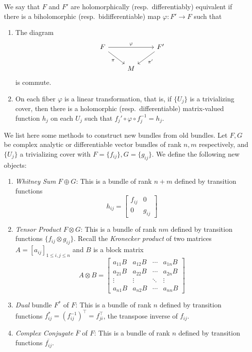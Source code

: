 \begin{defn}
    We say that $F$ and $F'$ are holomorphically (resp.\ differentiably) equivalent if there is a biholomorphic (resp.\ bidifferentiable) map $\varphi:F'\to F$ such that
    \begin{enumerate}[(1)]
        \item The diagram
        \[\begin{tikzcd}
            F\ar[rr,"\varphi"]\ar[dr,"\pi"'] & & F'\ar[dl,"\pi'"] \\
            & M &
        \end{tikzcd}\]
        is commute.
        \item On each fiber $\varphi$ is a linear transformation, that is, if $\{U_j\}$ is a trivializing cover, then there is a holomorphic (resp.\ differentiable) matrix-valued function $h_j$ on each $U_j$ such that $f_j'\circ\varphi\circ f_j^{-1}=h_j$.
    \end{enumerate}
\end{defn}

We list here some methods to construct new bundles from old bundles.
Let $F,G$ be complex analytic or differentiable vector bundles of rank $n,m$ respectively, and $\{U_j\}$ a trivializing cover with $F=\{f_{ij}\},G=\{g_{ij}\}$.
We define the following new objects:
\begin{enumerate}[(1)]
    \item \emph{Whitney Sum} $F\oplus G$:
    This is a bundle of rank $n+m$ defined by transition functions
    \[h_{ij}=\begin{bmatrix}
        f_{ij} & 0 \\
        0 & g_{ij}
    \end{bmatrix}\]
    \item \emph{Tensor Product} $F\otimes G$:
    This is a bundle of rank $nm$ defined by transition functions $\{f_{ij}\otimes g_{ij}\}$.
    Recall the \emph{Kronecker product} of two matrices $A=[a_{ij}]_{1\leq i,j\leq n}$ and $B$ is a block matrix
    \[A\otimes B=\begin{bmatrix}
        a_{11}B & a_{12}B & \cdots & a_{1n}B\\
        a_{21}B & a_{22}B & \cdots & a_{2n}B\\
        \vdots & \vdots & \ddots & \vdots \\
        a_{n1}B & a_{n2}B & \cdots & a_{nn}B
    \end{bmatrix}\]
    \item \emph{Dual} bundle $F^*$ of $F$:
    This is a bundle of rank $n$ defined by transition functions $f_{ij}^*=(f_{ij}^{-1})^\top=f_{ji}^\top$,
    the transpose inverse of $f_{ij}$.
    \item \emph{Complex Conjugate} $\overline{F}$ of $F$:
    This is a bundle of rank $n$ defined by transition functions $\overline{f_{ij}}$.
\end{enumerate}

